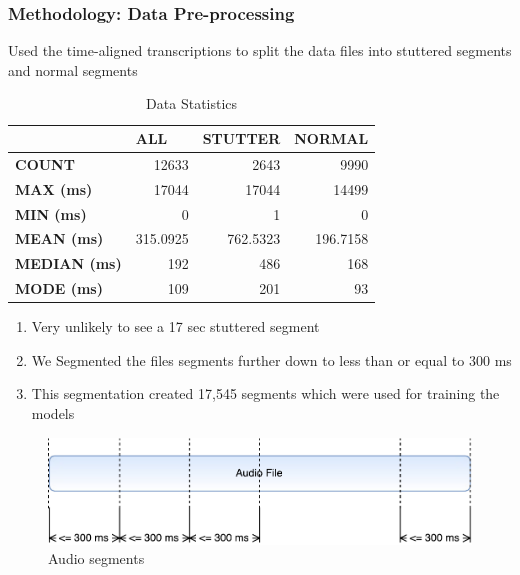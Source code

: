 \documentclass{beamer}
\begin{document}
\begin{frame}[allowframebreaks]
\frametitle{Methodology: Data Pre-processing}
Used the time-aligned transcriptions to split the data files into stuttered segments and normal segments
\begin{table}[ht]
\centering
\caption{Data Statistics}
\label{table:data-statistics}
\begin{tabular}{|l|r|r|r|}
\hline
                     & \multicolumn{1}{l|}{\textbf{ALL}} & \multicolumn{1}{l|}{\textbf{STUTTER}} & \multicolumn{1}{l|}{\textbf{NORMAL}} \\ \hline
\textbf{COUNT}       & 12633                             & 2643                                  & 9990                                 \\ \hline
\textbf{MAX (ms)}    & 17044                             & 17044                                 & 14499                                \\ \hline
\textbf{MIN (ms)}    & 0                                 & 1                                     & 0                                    \\ \hline
\textbf{MEAN (ms)}   & 315.0925                          & 762.5323                              & 196.7158                             \\ \hline
\textbf{MEDIAN (ms)} & 192                               & 486                                   & 168                                  \\ \hline
\textbf{MODE (ms)}   & 109                               & 201                                   & 93                                   \\ \hline
\end{tabular}
\end{table}
\break
\begin{enumerate}
 \item Very unlikely to see a 17 sec stuttered segment
 \item We Segmented the files segments further down to less than or equal to 300 ms
 \item This segmentation created 17,545 segments which were used for training the models
\end{enumerate}


\begin{figure}[ht]
    \centering
    \includegraphics[scale=0.7]{AudioSplits300ms.pdf}
    \caption{Audio segments}
    \label{fig:audioSegments}
\end{figure}
\end{frame}
\end{document}
